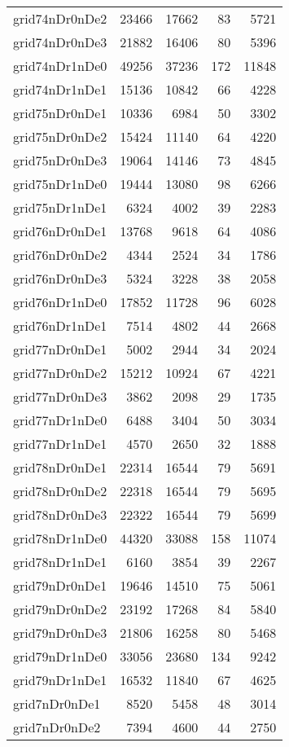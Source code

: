 \begin{tabular}{lrrrr}
grid74nDr0nDe2 & 23466 & 17662 & 83 & 5721 \\
grid74nDr0nDe3 & 21882 & 16406 & 80 & 5396 \\
grid74nDr1nDe0 & 49256 & 37236 & 172 & 11848 \\
grid74nDr1nDe1 & 15136 & 10842 & 66 & 4228 \\
grid75nDr0nDe1 & 10336 & 6984 & 50 & 3302 \\
grid75nDr0nDe2 & 15424 & 11140 & 64 & 4220 \\
grid75nDr0nDe3 & 19064 & 14146 & 73 & 4845 \\
grid75nDr1nDe0 & 19444 & 13080 & 98 & 6266 \\
grid75nDr1nDe1 & 6324 & 4002 & 39 & 2283 \\
grid76nDr0nDe1 & 13768 & 9618 & 64 & 4086 \\
grid76nDr0nDe2 & 4344 & 2524 & 34 & 1786 \\
grid76nDr0nDe3 & 5324 & 3228 & 38 & 2058 \\
grid76nDr1nDe0 & 17852 & 11728 & 96 & 6028 \\
grid76nDr1nDe1 & 7514 & 4802 & 44 & 2668 \\
grid77nDr0nDe1 & 5002 & 2944 & 34 & 2024 \\
grid77nDr0nDe2 & 15212 & 10924 & 67 & 4221 \\
grid77nDr0nDe3 & 3862 & 2098 & 29 & 1735 \\
grid77nDr1nDe0 & 6488 & 3404 & 50 & 3034 \\
grid77nDr1nDe1 & 4570 & 2650 & 32 & 1888 \\
grid78nDr0nDe1 & 22314 & 16544 & 79 & 5691 \\
grid78nDr0nDe2 & 22318 & 16544 & 79 & 5695 \\
grid78nDr0nDe3 & 22322 & 16544 & 79 & 5699 \\
grid78nDr1nDe0 & 44320 & 33088 & 158 & 11074 \\
grid78nDr1nDe1 & 6160 & 3854 & 39 & 2267 \\
grid79nDr0nDe1 & 19646 & 14510 & 75 & 5061 \\
grid79nDr0nDe2 & 23192 & 17268 & 84 & 5840 \\
grid79nDr0nDe3 & 21806 & 16258 & 80 & 5468 \\
grid79nDr1nDe0 & 33056 & 23680 & 134 & 9242 \\
grid79nDr1nDe1 & 16532 & 11840 & 67 & 4625 \\
grid7nDr0nDe1 & 8520 & 5458 & 48 & 3014 \\
grid7nDr0nDe2 & 7394 & 4600 & 44 & 2750 \\

\end{tabular}

